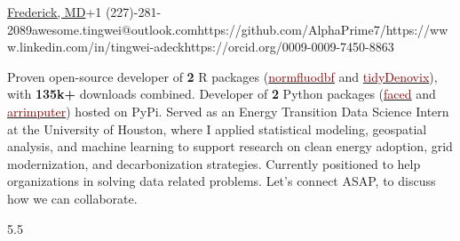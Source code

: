 \documentclass[9pt]{adeckcv} %
\begin{document}
  
{\href{https://www.google.com/maps/search/?api=1\&query=39.4723978,-77.4314006}{Frederick, MD}}{+1 (227)-281-2089}{awesome.tingwei@outlook.com}{https://github.com/AlphaPrime7/}{https://www.linkedin.com/in/tingwei-adeck}{https://orcid.org/0009-0009-7450-8863}

  

\begin{minipage}[t]{0.4\textwidth}
\vspace{-\baselineskip} 

{Proven open-source developer of \textbf{2} R packages (\href{https://alphaprime7.github.io/normfluodbf/}{\textcolor{maroon}{normfluodbf}} and \href{https://alphaprime7.github.io/tidyDenovix/}{\textcolor{maroon}{tidyDenovix}}), with \textbf{135k+} downloads combined. Developer of \textbf{2} Python packages (\href{https://pypi.org/project/faced/}{\textcolor{maroon}{faced}} and \href{https://pypi.org/project/arrimputer/1.3.0/}{\textcolor{maroon}{arrimputer}}) hosted on PyPi.} 
{Served as an Energy Transition Data Science Intern at the University of Houston, where I applied statistical modeling, geospatial analysis, and machine learning to support research on clean energy adoption, grid modernization, and decarbonization strategies.}
{Currently positioned to help organizations in solving data related problems. Let’s connect ASAP, to discuss how we can collaborate.}


\end{minipage}
\hfill %
\begin{minipage}[t]{0.5\textwidth} %
	\vspace{-\baselineskip} %
	\begin{barchart}{5.5}
	\end{barchart}
\end{minipage}
\end{document}
